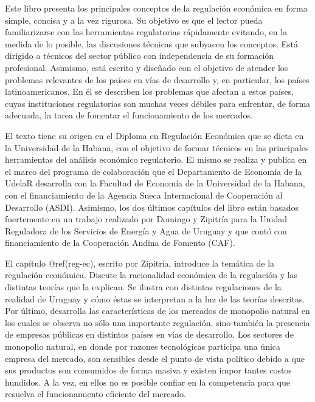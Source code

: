 \documentclass[
  12pt,
  spanish,
]{book}
\begin{document}
Este libro presenta los principales conceptos de la regulación económica
en forma simple, concisa y a la vez rigurosa. Su objetivo es que el
lector pueda familiarizarse con las herramientas regulatorias
rápidamente evitando, en la medida de lo posible, las discusiones
técnicas que subyacen los conceptos. Está dirigido a técnicos del sector
público con independencia de su formación profesional. Asimismo, está
escrito y diseñado con el objetivo de atender los problemas relevantes
de los países en vías de desarrollo y, en particular, los países
latinoamericanos. En él se describen los problemas que afectan a estos
países, cuyas instituciones regulatorias son muchas veces débiles para
enfrentar, de forma adecuada, la tarea de fomentar el funcionamiento de
los mercados.

El texto tiene su origen en el Diploma en Regulación Económica que se
dicta en la Universidad de la Habana, con el objetivo de formar técnicos
en las principales herramientas del análisis económico regulatorio. El
mismo se realiza y publica en el marco del programa de colaboración que
el Departamento de Economía de la UdelaR desarrolla con la Facultad de
Economía de la Universidad de la Habana, con el financiamiento de la
Agencia Sueca Internacional de Cooperación al Desarrollo (ASDI).
Asimismo, los dos últimos capítulos del libro están basados fuertemente
en un trabajo realizado por Domingo y Zipitría para la Unidad Reguladora
de los Servicios de Energía y Agua de Uruguay y que contó con
financiamiento de la Cooperación Andina de Fomento (CAF).

El capítulo @ref(reg-ec), escrito por Zipitría, introduce la temática de
la regulación económica. Discute la racionalidad económica de la
regulación y las distintas teorías que la explican. Se ilustra con
distintas regulaciones de la realidad de Uruguay y cómo éstas se
interpretan a la luz de las teorías descritas. Por último, desarrolla
las características de los mercados de monopolio natural en los cuales
se observa no sólo una importante regulación, sino también la presencia
de empresas públicas en distintos países en vías de desarrollo. Los
sectores de monopolio natural, en donde por razones tecnológicas
participa una única empresa del mercado, son sensibles desde el punto de
vista político debido a que sus productos son consumidos de forma masiva
y existen impor tantes costos hundidos. A la vez, en ellos no es posible
confiar en la competencia para que resuelva el funcionamiento eficiente
del mercado.
\end{document}
